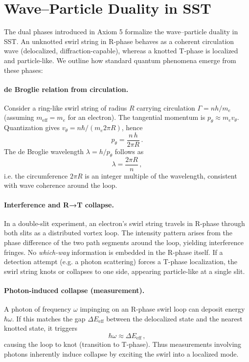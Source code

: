 \documentclass[11pt]{article}
\begin{document}
\section{Wave–Particle Duality in SST}
\label{sec:wave_particle_duality}
The dual phases introduced in Axiom 5 formalize the wave–particle duality in SST. An unknotted swirl string in R-phase behaves as a coherent circulation wave (delocalized, diffraction-capable), whereas a knotted T-phase is localized and particle-like. We outline how standard quantum phenomena emerge from these phases:

\paragraph{de Broglie relation from circulation.}
    Consider a ring-like swirl string of radius $R$ carrying circulation $\Gamma = n h/m_e$ (assuming $m_{\text{eff}}=m_e$ for an electron). The tangential momentum is $p_\theta \approx m_e v_\theta$. Quantization gives $v_\theta = n \hbar/(m_e 2\pi R)$, hence
    \[
        p_\theta = \frac{n\,h}{2\pi R}\,.
    \]
    The de Broglie wavelength $\lambda = h/p_\theta$ follows as
    \[
        \lambda = \frac{2\pi R}{n}\,,
    \]
    i.e. the circumference $2\pi R$ is an integer multiple of the wavelength, consistent with wave coherence around the loop.

\paragraph{Interference and R→T collapse.}
    In a double-slit experiment, an electron's swirl string travels in R-phase through both slits as a distributed vortex loop. The intensity pattern arises from the phase difference of the two path segments around the loop, yielding interference fringes. No \emph{which-way} information is embedded in the R-phase itself. If a detection attempt (e.g. a photon scattering) forces a T-phase localization, the swirl string knots or collapses to one side, appearing particle-like at a single slit.

\paragraph{Photon-induced collapse (measurement).}
    A photon of frequency $\omega$ impinging on an R-phase swirl loop can deposit energy $\hbar\omega$. If this matches the gap $\Delta E_{\text{eff}}$ between the delocalized state and the nearest knotted state, it triggers
    \[
        \hbar\omega \approx \Delta E_{\text{eff}}\,,
    \]
    causing the loop to knot (transition to T-phase). Thus measurements involving photons inherently induce collapse by exciting the swirl into a localized mode.
\end{document}
